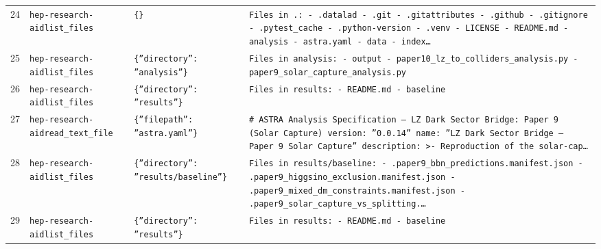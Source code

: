 \documentclass[11pt,a4paper]{article}
\begin{document}
\begin{longtable}{@{}p{}p{}p{}p{}@{}}
24 & \texttt{hep-research-aid}\newline\texttt{list\_\allowbreak{}files} & \texttt{\{\}\allowbreak{}} & \texttt{Files in .:\allowbreak{}   - .datalad   - .git   - .gitattributes   - .github   - .gitignore   - .pytest\_\allowbreak{}cache   - .python-version   - .venv   - LICENSE   - README.md   - analysis   - astra.yaml   - data   - index\ldots{}\allowbreak{}} \\
25 & \texttt{hep-research-aid}\newline\texttt{list\_\allowbreak{}files} & \texttt{\{''directory'':\allowbreak{} ''analysis''\}\allowbreak{}} & \texttt{Files in analysis:\allowbreak{}   - output   - paper10\_\allowbreak{}lz\_\allowbreak{}to\_\allowbreak{}colliders\_\allowbreak{}analysis.py   - paper9\_\allowbreak{}solar\_\allowbreak{}capture\_\allowbreak{}analysis.py} \\
26 & \texttt{hep-research-aid}\newline\texttt{list\_\allowbreak{}files} & \texttt{\{''directory'':\allowbreak{} ''results''\}\allowbreak{}} & \texttt{Files in results:\allowbreak{}   - README.md   - baseline} \\
27 & \texttt{hep-research-aid}\newline\texttt{read\_\allowbreak{}text\_\allowbreak{}file} & \texttt{\{''filepath'':\allowbreak{} ''astra.yaml''\}\allowbreak{}} & \texttt{\# ASTRA Analysis Specification --- LZ Dark Sector Bridge:\allowbreak{} Paper 9 (Solar Capture)\allowbreak{}  version:\allowbreak{} ''0.0.14'' name:\allowbreak{} ''LZ Dark Sector Bridge --- Paper 9 Solar Capture'' description:\allowbreak{} \textgreater{}\allowbreak{}-   Reproduction of the solar-cap\ldots{}\allowbreak{}} \\
28 & \texttt{hep-research-aid}\newline\texttt{list\_\allowbreak{}files} & \texttt{\{''directory'':\allowbreak{} ''results/\allowbreak{}baseline''\}\allowbreak{}} & \texttt{Files in results/\allowbreak{}baseline:\allowbreak{}   - .paper9\_\allowbreak{}bbn\_\allowbreak{}predictions.manifest.json   - .paper9\_\allowbreak{}higgsino\_\allowbreak{}exclusion.manifest.json   - .paper9\_\allowbreak{}mixed\_\allowbreak{}dm\_\allowbreak{}constraints.manifest.json   - .paper9\_\allowbreak{}solar\_\allowbreak{}capture\_\allowbreak{}vs\_\allowbreak{}splitting.\ldots{}\allowbreak{}} \\
29 & \texttt{hep-research-aid}\newline\texttt{list\_\allowbreak{}files} & \texttt{\{''directory'':\allowbreak{} ''results''\}\allowbreak{}} & \texttt{Files in results:\allowbreak{}   - README.md   - baseline} \\

\end{longtable}
\end{document}
